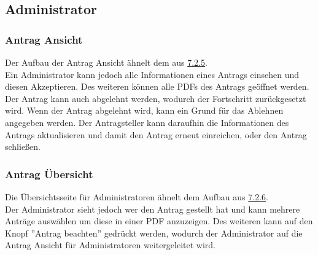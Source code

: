 \subsection{Administrator}
\subsubsection{Antrag Ansicht}
Der Aufbau der Antrag Ansicht ähnelt dem aus \hyperref[sec:antrag_ansicht]{7.2.5}.\\
Ein Administrator kann jedoch alle Informationen eines Antrags einsehen und diesen Akzeptieren. Des weiteren können alle PDFs des Antrags geöffnet werden. Der Antrag kann auch abgelehnt werden, wodurch der Fortschritt zurückgesetzt wird. Wenn der Antrag abgelehnt wird, kann ein Grund für das Ablehnen angegeben werden. Der Antragsteller kann daraufhin die Informationen des Antrags aktualisieren und damit den Antrag erneut einreichen, oder den Antrag schließen.
\subsubsection{Antrag Übersicht}
Die Übersichtsseite für Administratoren ähnelt dem Aufbau aus \hyperref[sec:antrag_uebersicht]{7.2.6}.\\
Der Administrator sieht jedoch wer den Antrag gestellt hat und kann mehrere Anträge auswählen um diese in einer PDF anzuzeigen.
Des weiteren kann auf den Knopf ''Antrag beachten'' gedrückt werden, wodurch der Administrator auf die Antrag Ansicht für Administratoren weitergeleitet wird.